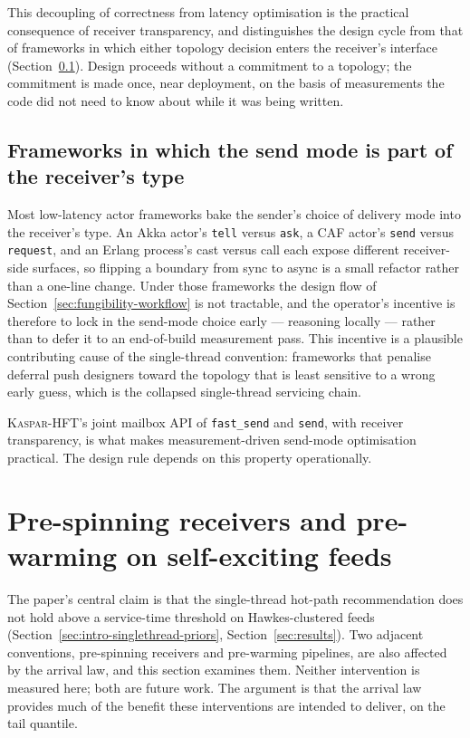 \documentclass[11pt]{article}
\newcommand{\kasparhft}{\textsc{Kaspar-HFT}}
\begin{document}
This decoupling of correctness from latency optimisation is the practical consequence of
receiver transparency, and distinguishes the design cycle from that of frameworks in
which either topology decision enters the receiver's interface
(Section~\ref{sec:fungibility-contrast}). Design proceeds without
a commitment to a topology; the commitment is made once, near deployment, on the basis of
measurements the code did not need to know about while it was being written.

\subsection{Frameworks in which the send mode is part of the receiver's type}
\label{sec:fungibility-contrast}

Most low-latency actor frameworks bake the sender's choice of delivery mode into the
receiver's type. An Akka actor's \texttt{tell} versus \texttt{ask}, a CAF actor's
\texttt{send} versus \texttt{request}, and an Erlang process's cast versus call each
expose different receiver-side surfaces, so flipping a boundary from sync to async is a
small refactor rather than a one-line change. Under those frameworks the design flow of
Section~\ref{sec:fungibility-workflow} is not tractable, and the operator's incentive is
therefore to lock in the send-mode choice early --- reasoning locally --- rather than to
defer it to an end-of-build measurement pass. This incentive is a plausible contributing cause of the single-thread convention: frameworks that penalise deferral push
designers toward the topology that is least sensitive to a wrong early guess, which is the
collapsed single-thread servicing chain.

\kasparhft{}'s joint mailbox API of \texttt{fast\_send} and \texttt{send}, with
receiver transparency, is what makes measurement-driven send-mode optimisation practical.
The design rule depends on this property operationally.


\section{Pre-spinning receivers and pre-warming on self-exciting feeds}
\label{sec:other-arch}

The paper's central claim is that the single-thread hot-path recommendation does not
hold above a service-time threshold on Hawkes-clustered feeds
(Section~\ref{sec:intro-singlethread-priors}, Section~\ref{sec:results}). Two adjacent
conventions, pre-spinning receivers and pre-warming pipelines, are also affected by the
arrival law, and this section examines them. Neither intervention is measured
here; both are future work. The argument is that the arrival law provides much of the
benefit these interventions are intended to deliver, on the tail quantile.
\end{document}
